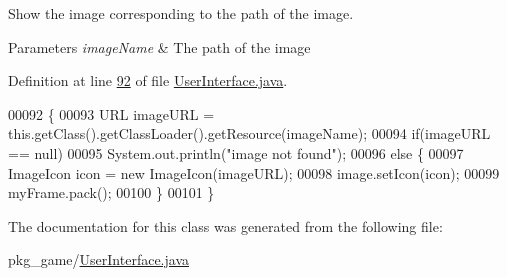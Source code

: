 Show the image corresponding to the path of the image. 


\begin{DoxyParams}{Parameters}
{\em image\-Name} & The path of the image \\
\hline
\end{DoxyParams}


Definition at line \hyperlink{UserInterface_8java_source_l00092}{92} of file \hyperlink{UserInterface_8java_source}{User\-Interface.\-java}.


\begin{DoxyCode}
00092                                             \{
00093         URL imageURL = this.getClass().getClassLoader().getResource(imageName);
00094         \textcolor{keywordflow}{if}(imageURL == null)
00095             System.out.println(\textcolor{stringliteral}{"image not found"});
00096         \textcolor{keywordflow}{else} \{
00097             ImageIcon icon = \textcolor{keyword}{new} ImageIcon(imageURL);
00098             image.setIcon(icon);
00099             myFrame.pack();
00100         \}
00101     \}
\end{DoxyCode}


The documentation for this class was generated from the following file\-:\begin{DoxyCompactItemize}
\item 
pkg\-\_\-game/\hyperlink{UserInterface_8java}{User\-Interface.\-java}\end{DoxyCompactItemize}
